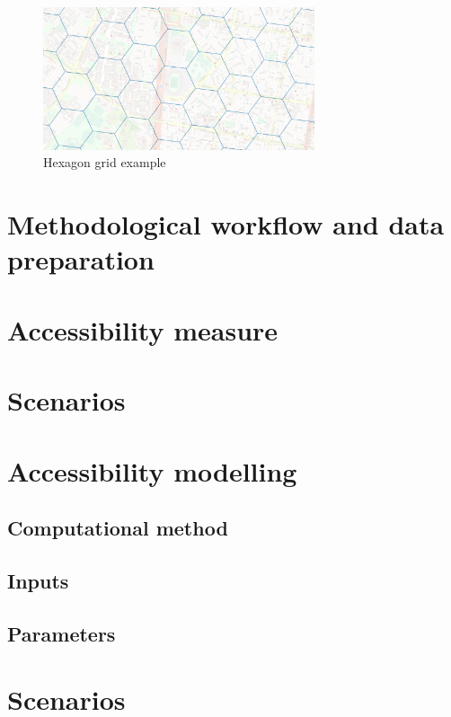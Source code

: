 \documentclass[12pt, a4paper]{report}
\begin{document}
\begin{figure}[H]
    \centering
    \includegraphics[width=8cm]{Images/Hex_grid.png}
    \caption{Hexagon grid example \citep{ubertechnologiesH3HexagonalHierarchical2023}}
    \label{fig:Hex_grid_example}
\end{figure}

\section{Methodological workflow and data preparation}

\section{Accessibility measure}

\section{Scenarios}

\section{Accessibility modelling}


\subsection{Computational method}

\subsection{Inputs}

\subsection{Parameters}


\section{Scenarios}
\end{document}
